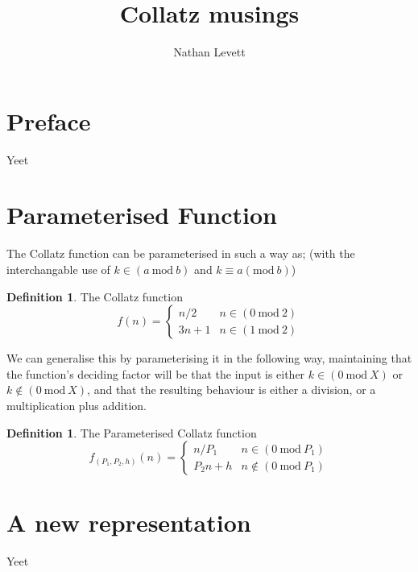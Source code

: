 \documentclass[12pt,a4paper]{amsart}
\author{Nathan Levett}
\title{Collatz musings}
\numberwithin{equation}{section}
\theoremstyle{plain}
\theoremstyle{definition}
\newtheorem{Def}[Th]{Definition}
\begin{document}
	
\tableofcontents

\section{Preface}
	Yeet

\section{Parameterised Function}

The Collatz function can be parameterised in such a way as; (with the interchangable use of $k \in \left ( a\:\mathrm{mod}\:b \right )$ and $k \equiv a \left ( \mathrm{mod}\:b \right )$) 

\begin{Def} The Collatz function
\begin{equation}
f\left ( n \right )=\left\{\begin{matrix}
n/2  & n \in \left ( 0\:\mathrm{mod}\:2 \right ) \\ 
3n+1 & n \in \left ( 1\:\mathrm{mod}\:2 \right )
\end{matrix}\right.
\end{equation}
\end{Def}

We can generalise this by parameterising it in the following way, maintaining that the function's deciding factor will be that the input is either $k \in \left ( 0\:\mathrm{mod}\:X \right )$ or $k \notin \left ( 0\:\mathrm{mod}\:X \right )$, and that the resulting behaviour is either a division, or a multiplication plus addition.

\begin{Def} The Parameterised Collatz function
\begin{equation}
f_{\left (P_{1},P_{2},h\right )}\left ( n \right )=\left\{\begin{matrix}
n/P_{1}  & n \in \left ( 0\:\mathrm{mod}\:P_{1} \right ) \\ 
P_{2}n+h & n \notin \left ( 0\:\mathrm{mod}\:P_{1} \right )
\end{matrix}\right.
\end{equation}
\end{Def}


\section{A new representation}
	Yeet
\end{document}

